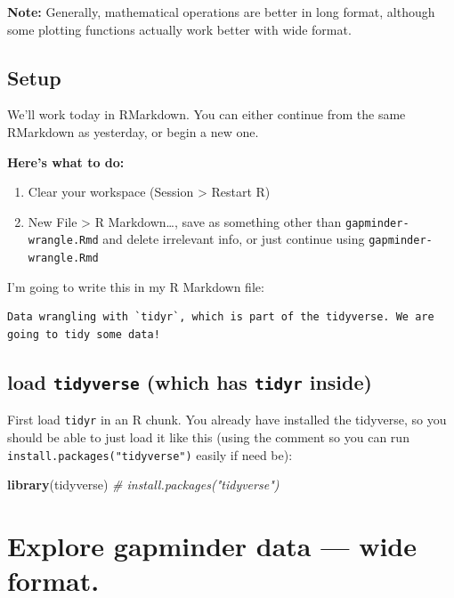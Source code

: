 \documentclass[]{book}
\newenvironment{Shaded}{\begin{snugshade}}{\end{snugshade}}
\newcommand{\KeywordTok}[1]{\textcolor[rgb]{0.13,0.29,0.53}{\textbf{#1}}}
\newcommand{\CommentTok}[1]{\textcolor[rgb]{0.56,0.35,0.01}{\textit{#1}}}
\newcommand{\NormalTok}[1]{#1}
\providecommand{\tightlist}{%
  \setlength{\itemsep}{0pt}\setlength{\parskip}{0pt}}
\theoremstyle{definition}
\theoremstyle{definition}
\theoremstyle{definition}
\theoremstyle{remark}
\begin{document}
\textbf{Note:} Generally, mathematical operations are better in long
format, although some plotting functions actually work better with wide
format.

\subsection{Setup}\label{setup-1}

We'll work today in RMarkdown. You can either continue from the same
RMarkdown as yesterday, or begin a new one.

\textbf{Here's what to do:}

\begin{enumerate}
\def\labelenumi{\arabic{enumi}.}
\tightlist
\item
  Clear your workspace (Session \textgreater{} Restart R)
\item
  New File \textgreater{} R Markdown\ldots{}, save as something other
  than \texttt{gapminder-wrangle.Rmd} and delete irrelevant info, or
  just continue using \texttt{gapminder-wrangle.Rmd}
\end{enumerate}

I'm going to write this in my R Markdown file:

\begin{verbatim}
Data wrangling with `tidyr`, which is part of the tidyverse. We are going to tidy some data!
\end{verbatim}

\subsection{\texorpdfstring{load \texttt{tidyverse} (which has
\texttt{tidyr}
inside)}{load tidyverse (which has tidyr inside)}}\label{load-tidyverse-which-has-tidyr-inside}

First load \texttt{tidyr} in an R chunk. You already have installed the
tidyverse, so you should be able to just load it like this (using the
comment so you can run \texttt{install.packages("tidyverse")} easily if
need be):

\begin{Shaded}
\begin{Highlighting}[]
\KeywordTok{library}\NormalTok{(tidyverse) }\CommentTok{# install.packages("tidyverse")}
\end{Highlighting}
\end{Shaded}

\section{Explore gapminder data --- wide
format.}\label{explore-gapminder-data-wide-format.}
\end{document}
